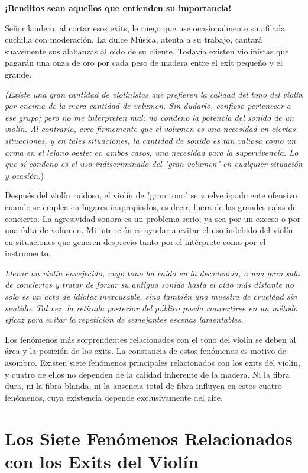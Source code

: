 \documentclass[12pt]{book}
\begin{document}
\textbf{¡Benditos sean aquellos que entienden su importancia!}  

Señor laudero, al cortar esos exits, le ruego que use ocasionalmente su afilada cuchilla con moderación. La dulce Música, atenta a su trabajo, cantará suavemente sus alabanzas al oído de su cliente. Todavía existen violinistas que pagarán una onza de oro por cada peso de madera entre el exit pequeño y el grande.

\textit{(Existe una gran cantidad de violinistas que prefieren la calidad del tono del violín por encima de la mera cantidad de volumen. Sin dudarlo, confieso pertenecer a ese grupo; pero no me interpreten mal: no condeno la potencia del sonido de un violín. Al contrario, creo firmemente que el volumen es una necesidad en ciertas situaciones, y en tales situaciones, la cantidad de sonido es tan valiosa como un arma en el lejano oeste; en ambos casos, una necesidad para la supervivencia. Lo que sí condeno es el uso indiscriminado del "gran volumen" en cualquier situación y ocasión.})  

Después del violín ruidoso, el violín de "gran tono" se vuelve igualmente ofensivo cuando se emplea en lugares inapropiados, es decir, fuera de las grandes salas de concierto. La agresividad sonora es un problema serio, ya sea por un exceso o por una falta de volumen. Mi intención es ayudar a evitar el uso indebido del violín en situaciones que generen desprecio tanto por el intérprete como por el instrumento.  

\textit{Llevar un violín envejecido, cuyo tono ha caído en la decadencia, a una gran sala de conciertos y tratar de forzar su antiguo sonido hasta el oído más distante no solo es un acto de idiotez inexcusable, sino también una muestra de crueldad sin sentido. Tal vez, la retirada posterior del público pueda convertirse en un método eficaz para evitar la repetición de semejantes escenas lamentables.}  

Los fenómenos más sorprendentes relacionados con el tono del violín se deben al área y la posición de los exits. La constancia de estos fenómenos es motivo de asombro. Existen siete fenómenos principales relacionados con los exits del violín, y cuatro de ellos no dependen de la calidad inherente de la madera. Ni la fibra dura, ni la fibra blanda, ni la ausencia total de fibra influyen en estos cuatro fenómenos, cuya existencia depende exclusivamente del aire.

\section*{Los Siete Fenómenos Relacionados con los Exits del Violín}
\end{document}
